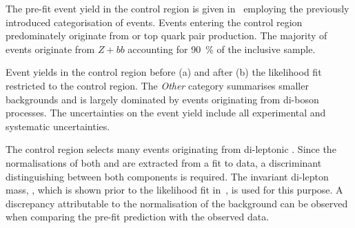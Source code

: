 The pre-fit event yield in the \ZHF control region is given
in~ employing the previously introduced
categorisation of \Zjets events. Events entering the control region
predominately originate from \ZHF or top quark pair production.
The majority of \ZHF events originate from $Z + bb$ accounting for
\SI{90}{\percent} of the inclusive sample.

\begin{table}[htbp]
  \begin{subtable}{0.5\textwidth}
    \centering

    

    \label{tab:zcr_prefit_yields}
  \end{subtable}
  \begin{subtable}{0.5\textwidth}
    \centering

    

    \label{tab:zcr_postfit_yields}
  \end{subtable}

  \caption{Event yields in the \ZHF control region before (a) and
    after (b) the likelihood fit restricted to the control region. The
    \emph{Other} category summarises smaller backgrounds and is
    largely dominated by events originating from di-boson
    processes. The uncertainties on the event yield include all
    experimental and systematic uncertainties.}
  \label{tab:zcr_yields}
\end{table}

The \ZHF control region selects many events originating from
di-leptonic \ttbar. Since the normalisations of both \ttbar and \ZHF
are extracted from a fit to data, a discriminant distinguishing
between both components is required. The invariant di-lepton mass,
\mll, which is shown prior to the likelihood fit
in~, is used for this purpose. A discrepancy
attributable to the normalisation of the \ZHF background can be
observed when comparing the pre-fit prediction with the observed data.

